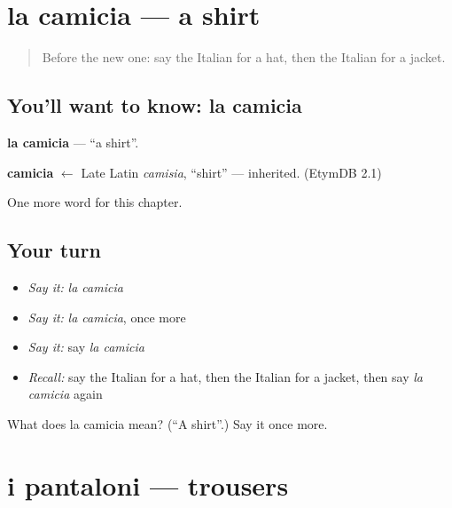 \section[la camicia]{la camicia — a shirt}

\label{lesson:IT-C105-camicia}



\begin{quote}
Before the new one: say the Italian for a hat, then the Italian for a jacket.
\end{quote}

\subsection*{You'll want to know: la camicia}
\textbf{la camicia} — \textquotedblleft{}a shirt\textquotedblright{}.

\begin{cousinweb}
\textbf{camicia} $\leftarrow$ Late Latin \emph{camisia}, \textquotedblleft{}shirt\textquotedblright{} — inherited. (EtymDB 2.1)
\end{cousinweb}

\begin{grammarlens}[title={What you've built}]
One more word for this chapter.
\end{grammarlens}

\subsection*{Your turn}
\begin{itemize}
\raggedright
  \item \emph{Say it:} \emph{la camicia}
  \item \emph{Say it:} \emph{la camicia}, once more
  \item \emph{Say it:} say \emph{la camicia}
  \item \emph{Recall:} say the Italian for a hat, then the Italian for a jacket, then say \emph{la camicia} again
\end{itemize}

\begin{tcolorbox}[breakable,colback=teal!4,colframe=teal!35!black,title={Before you move on}]
What does la camicia mean? (\textquotedblleft{}A shirt\textquotedblright{}.) Say it once more.
\end{tcolorbox}
\section[i pantaloni]{i pantaloni — trousers}

